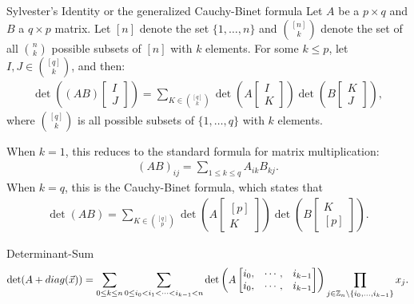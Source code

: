 \begin{thm}{Sylvester's Identity or the generalized Cauchy-Binet formula}\proofbreak
    Let $A$ be a $p \times q$ and $B$ a $q \times p$ matrix. Let $[n]$ denote the set $\{1, \ldots, n\}$ and $\binom{[n]}{k}$ denote the set of all $\binom{n}{k}$ possible subsets of $[n]$ with $k$ elements. For some $k \leq p$, let $I, J \in \binom{[q]}{k}$, and then:
    \begin{align*}
        \det\left((AB)\begin{bmatrix}
            I \\ J
        \end{bmatrix}\right) = \sum_{K\in \binom{[q]}{k}}\det\left(A\begin{bmatrix}I \\ K\end{bmatrix}\right)\det\left(B\begin{bmatrix}K \\ J\end{bmatrix}\right),
    \end{align*}
    where $\binom{[q]}{k}$ is all possible subsets of $\{1, \ldots, q\}$ with $k$ elements.
\end{thm}

\begin{rmk}
    When $k = 1$, this reduces to the standard formula for matrix multiplication:
    \begin{align*}
        (AB)_{ij} = \sum_{1\leq k \leq q}A_{ik}B_{kj}.
    \end{align*}
    When $k = q$, this is the Cauchy-Binet formula, which states that
    \begin{align*}
        \det(AB) = \sum_{K\in \binom{[q]}{p}}\det\left(A\begin{bmatrix}[p] \\ K\end{bmatrix}\right)\det\left(B\begin{bmatrix}K \\ [p]\end{bmatrix}\right).
    \end{align*}
\end{rmk}

\begin{lemma}{Determinant-Sum}\label{lemma:determinant-sum}\proofbreak
    \begin{align*}
        \det(A + diag(\vec{x})) = \sum_{0 \leq k \leq n}\sum_{0 \leq i_0 < i_1 < \cdots < i_{k-1} < n}\det\left(A\begin{bmatrix}
            i_0, &\cdots, &i_{k-1} \\ i_0, &\cdots, &i_{k-1}
        \end{bmatrix}\right)\prod_{j \in \mathbb{Z}_n \setminus \{i_0, \ldots, i_{k-1}\}}x_j.
    \end{align*}
\end{lemma}

